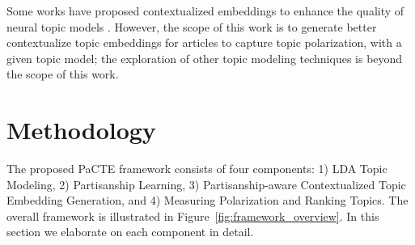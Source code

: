 \documentclass[11pt]{article}
\begin{document}
Some works have proposed contextualized embeddings to enhance the quality of neural topic models \cite{bianchi2020pre, chaudhary2020topicbert}. However, the scope of this work is to generate better contextualize topic embeddings for articles to capture topic polarization, with a given topic model; the exploration of other topic modeling techniques is beyond the scope of this work. 



\section{Methodology}
\label{sec:method}
The proposed PaCTE framework consists of four components: 1) LDA Topic Modeling, 2) Partisanship Learning, 3) Partisanship-aware Contextualized Topic Embedding Generation, and 4) Measuring Polarization and Ranking Topics. The overall framework is illustrated in Figure~\ref{fig:framework_overview}. In this section we elaborate on each component in detail.  
\end{document}
